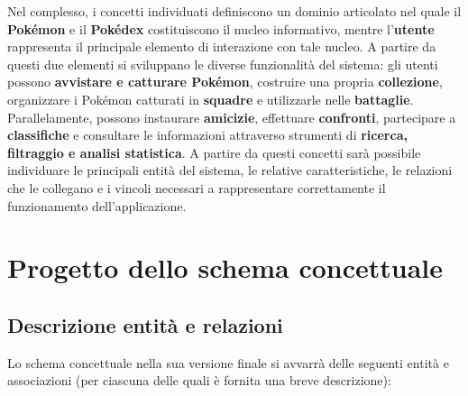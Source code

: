 \documentclass[a4paper,12pt]{report}
\begin{document}
\vspace{0,5 cm}
Nel complesso, i concetti individuati definiscono un dominio articolato nel quale il \textbf{Pokémon} e il \textbf{Pokédex} costituiscono il nucleo informativo, mentre l'\textbf{utente} rappresenta il principale elemento di interazione con tale nucleo. A partire da questi due elementi si sviluppano le diverse funzionalità del sistema: gli utenti possono \textbf{avvistare e catturare Pokémon}, costruire una propria \textbf{collezione}, organizzare i Pokémon catturati in \textbf{squadre} e utilizzarle nelle \textbf{battaglie}. Parallelamente, possono instaurare \textbf{amicizie}, effettuare \textbf{confronti}, partecipare a \textbf{classifiche} e consultare le informazioni attraverso strumenti di \textbf{ricerca, filtraggio e analisi statistica}. A partire da questi concetti sarà possibile individuare le principali entità del sistema, le relative caratteristiche, le relazioni che le collegano e i vincoli necessari a rappresentare correttamente il funzionamento dell'applicazione. 
\newpage

\chapter{Progetto dello schema concettuale}

\section{Descrizione entità e relazioni}

\renewcommand{\arraystretch}{1.5}
\normalsize

\noindent
Lo schema concettuale nella sua versione finale si avvarrà delle seguenti entità e associazioni (per ciascuna delle quali è fornita una breve descrizione):
\end{document}
